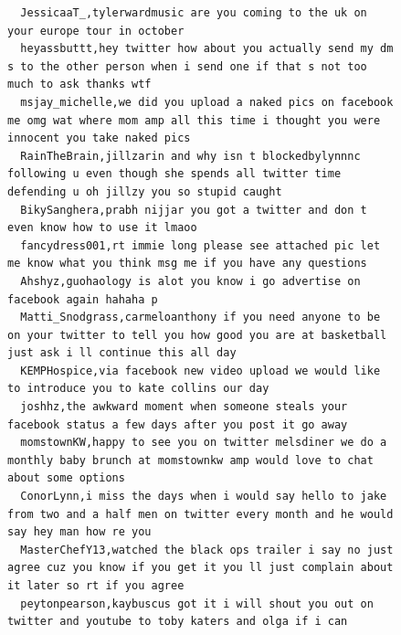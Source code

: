 \begin{figure}[htpb]
\begin{verbatim}
  JessicaaT_,tylerwardmusic are you coming to the uk on your europe tour in october
  heyassbuttt,hey twitter how about you actually send my dm s to the other person when i send one if that s not too much to ask thanks wtf
  msjay_michelle,we did you upload a naked pics on facebook me omg wat where mom amp all this time i thought you were innocent you take naked pics
  RainTheBrain,jillzarin and why isn t blockedbylynnnc following u even though she spends all twitter time defending u oh jillzy you so stupid caught
  BikySanghera,prabh nijjar you got a twitter and don t even know how to use it lmaoo
  fancydress001,rt immie long please see attached pic let me know what you think msg me if you have any questions
  Ahshyz,guohaology is alot you know i go advertise on facebook again hahaha p
  Matti_Snodgrass,carmeloanthony if you need anyone to be on your twitter to tell you how good you are at basketball just ask i ll continue this all day
  KEMPHospice,via facebook new video upload we would like to introduce you to kate collins our day
  joshhz,the awkward moment when someone steals your facebook status a few days after you post it go away
  momstownKW,happy to see you on twitter melsdiner we do a monthly baby brunch at momstownkw amp would love to chat about some options
  ConorLynn,i miss the days when i would say hello to jake from two and a half men on twitter every month and he would say hey man how re you
  MasterChefY13,watched the black ops trailer i say no just agree cuz you know if you get it you ll just complain about it later so rt if you agree
  peytonpearson,kaybuscus got it i will shout you out on twitter and youtube to toby katers and olga if i can


\end{verbatim}
\end{figure}
